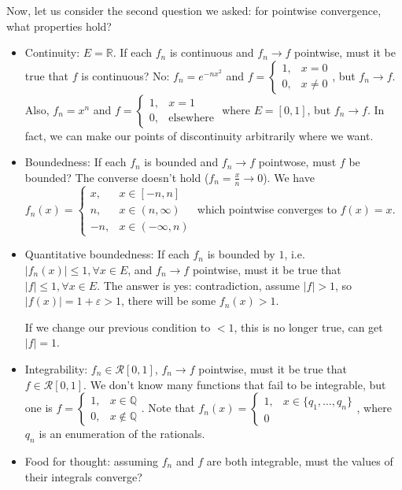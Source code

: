 \documentclass{article}
\theoremstyle{plain}
\theoremstyle{remark}
\newcommand{\Q}{{\mathbb Q}}
\newcommand{\R}{{\mathbb R}}
\newcommand{\ep}{{\varepsilon}}
\begin{document}
Now, let us consider the second question we asked:
for pointwise convergence, what properties hold?
\begin{itemize}
	\item Continuity: $E = \R$. If each $f_n$ is continuous and $f_n \to f$ pointwise,
		must it be true that $f$ is continuous?
		No: $f_n = e^{-nx^2}$ and $f = \begin{cases} 1, &x=0 \\ 0, &x\neq 0 \end{cases}$,
		but $f_n \to f$.
		Also, $f_n = x^n$ and $f = \begin{cases} 1, & x=1\\ 0, & \text{elsewhere}\end{cases}$
		where $E = [0,1]$, but $f_n \to f$.
		In fact, we can make our points of discontinuity arbitrarily where we want.
	\item Boundedness: If each $f_n$ is bounded and $f_n \to f$ pointwose, must $f$ be bounded?
		The converse doesn't hold ($f_n = \frac{x}{n} \to 0$).
		We have $f_n(x) = \begin{cases} x, &x\in[-n,n]\\n, &x\in(n,\infty)\\
		-n, &x\in(-\infty,n)\end{cases}$
		which pointwise converges to $f(x) = x$.
	\item Quantitative boundedness: If each $f_n$ is bounded by $1$,
		i.e. $|f_n(x)| \leq 1, \forall x \in E$,
		and $f_n \to f$ pointwise, must it be true that $|f| \leq 1,
		\forall x \in E$.
		The answer is yes: contradiction, assume $|f| > 1$,
		so $|f(x)| = 1 + \ep > 1$, there will be some $f_n(x) > 1$.
		
		If we change our previous condition to $<1$, this is no longer true,
		can get $|f| = 1$.
	\item Integrability: $f_n \in \mathcal{R}[0,1]$, $f_n \to f$ pointwise,
		must it be true that $f \in \mathcal{R}[0,1]$.
		We don't know many functions that fail to be integrable,
		but one is $f = \begin{cases} 1, & x \in \Q\\ 0, & x \not\in\Q\end{cases}$.
		Note that $f_n(x) = \begin{cases} 1, & x\in\{q_1,\dots,q_n\}\\0\end{cases}$,
		where $q_n$ is an enumeration of the rationals.
	\item Food for thought: assuming $f_n$ and $f$ are both integrable,
		must the values of their integrals converge?
\end{itemize}
\end{document}
